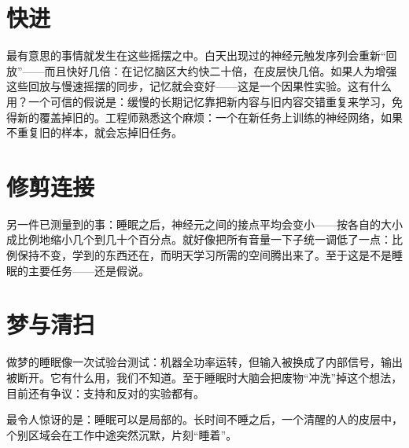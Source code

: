 
\section*{快进}

最有意思的事情就发生在这些摇摆之中。白天出现过的神经元触发序列会重新“回放”——而且快好几倍：在记忆脑区大约快二十倍，在皮层快几倍。如果人为增强这些回放与慢速摇摆的同步，记忆就会变好——这是一个因果性实验。这有什么用？一个可信的假说是：缓慢的长期记忆靠把新内容与旧内容交错重复来学习，免得新的覆盖掉旧的。工程师熟悉这个麻烦：一个在新任务上训练的神经网络，如果不重复旧的样本，就会忘掉旧任务。

\section*{修剪连接}

另一件已测量到的事：睡眠之后，神经元之间的接点平均会变小——按各自的大小成比例地缩小几个到几十个百分点。就好像把所有音量一下子统一调低了一点：比例保持不变，学到的东西还在，而明天学习所需的空间腾出来了。至于这是不是睡眠的主要任务——还是假说。

\section*{梦与清扫}

做梦的睡眠像一次试验台测试：机器全功率运转，但输入被换成了内部信号，输出被断开。它有什么用，我们不知道。至于睡眠时大脑会把废物“冲洗”掉这个想法，目前还有争议：支持和反对的实验都有。

最令人惊讶的是：睡眠可以是局部的。长时间不睡之后，一个清醒的人的皮层中，个别区域会在工作中途突然沉默，片刻“睡着”。

